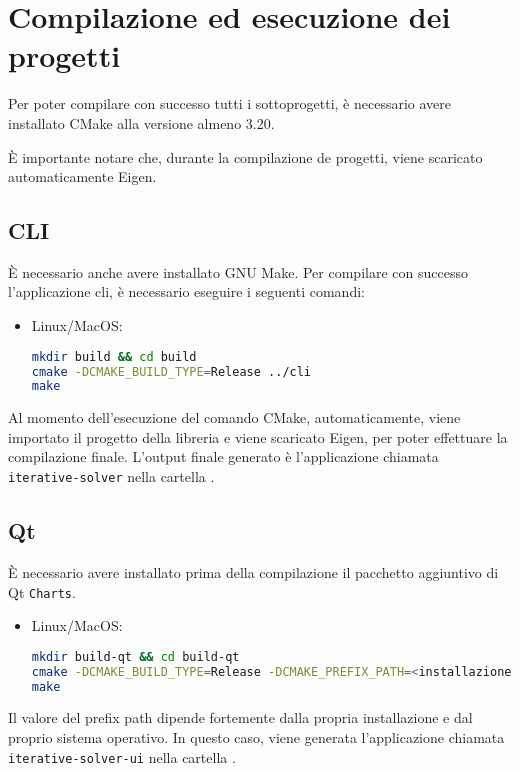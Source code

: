 	\appendix
\section{Compilazione ed esecuzione dei progetti}
Per poter compilare con successo tutti i sottoprogetti, è necessario avere installato CMake alla versione almeno 3.20.

È importante notare che, durante la compilazione de progetti, viene scaricato automaticamente Eigen.

\subsection{CLI}
È necessario anche avere installato GNU Make\cite{Make}.
Per compilare con successo l'applicazione cli, è necessario eseguire i seguenti comandi:
\begin{itemize}
	\item Linux/MacOS: 
	\begin{lstlisting}[language=Bash]
mkdir build && cd build
cmake -DCMAKE_BUILD_TYPE=Release ../cli
make \end{lstlisting}
\end{itemize}


Al momento dell'esecuzione del comando CMake, automaticamente, viene importato il progetto della libreria e viene scaricato Eigen, per poter effettuare la compilazione finale. L'output finale generato è l'applicazione chiamata \texttt{iterative-solver} nella cartella .

\subsection{Qt}
È necessario avere installato prima della compilazione il pacchetto aggiuntivo di Qt \texttt{Charts}.
\begin{itemize}
	\item Linux/MacOS: 
	\begin{lstlisting}[language=Bash]
mkdir build-qt && cd build-qt
cmake -DCMAKE_BUILD_TYPE=Release -DCMAKE_PREFIX_PATH=<installazione di Qt>/<versione>/<sistema> ../QTInterface
make \end{lstlisting}
\end{itemize}
Il valore del prefix path dipende fortemente dalla propria installazione e dal proprio sistema operativo. In questo caso, viene generata l'applicazione chiamata \texttt{iterative-solver-ui} nella cartella .